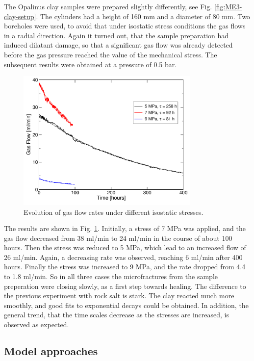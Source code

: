 The Opalinus clay samples were prepared slightly differently, see Fig. \ref{fig:ME3-clay-setup}. The cylinders had a height of 160 mm and a diameter of 80 mm. Two boreholes were used, to avoid that under isostatic stress conditions the gas flows in a radial direction. Again it turned out, that the sample preparation had induced dilatant damage, so that a significant gas flow was already detected before the gas pressure reached the value of the mechanical stress. The subsequent results were obtained at a pressure of 0.5 bar. 

\begin{figure}[!ht]
\centering
\includegraphics[width=9cm]{figures/mex3-senkrecht-alle.png}
\caption{Evolution of gas flow rates under different isostatic stresses.}
\label{fig:ME3-clay-flows}
\end{figure}

The results are shown in Fig. \ref{fig:ME3-clay-flows}. Initially, a stress of 7 MPa was applied, and the gas flow decreased from 38 ml/min to 24 ml/min in the course of about 100 hours. Then the stress was reduced to 5 MPa, which lead to an increased flow of 26 ml/min. Again, a decreasing rate was observed, reaching 6 ml/min after 400 hours. Finally the stress was increased to 9 MPa, and the rate dropped from 4.4 to 1.8 ml/min. So in all three cases the microfractures from the sample preperation were closing slowly, as a first step towards healing. The difference to the previous experiment with rock salt is stark. The clay reacted much more smoothly, and good fits to exponential decays could be obtained. In addition, the general trend, that the time scales decrease as the stresses are increased, is observed as expected. 

\subsection{Model approaches}
